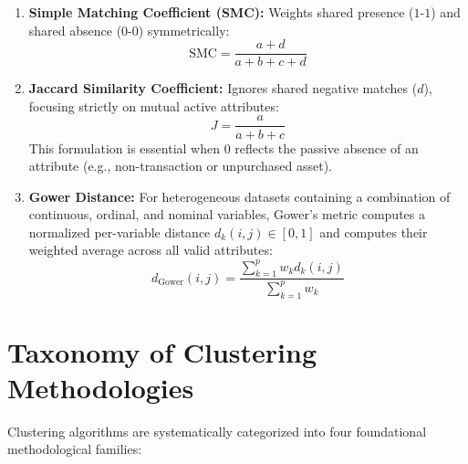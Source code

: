 \begin{enumerate}
    \item \textbf{Simple Matching Coefficient (SMC):} Weights shared presence ($1$-$1$) and shared absence ($0$-$0$) symmetrically:
    \begin{equation}
        \text{SMC} = \frac{a + d}{a + b + c + d}
    \end{equation}
    \item \textbf{Jaccard Similarity Coefficient:} Ignores shared negative matches ($d$), focusing strictly on mutual active attributes:
    \begin{equation}
        J = \frac{a}{a + b + c}
    \end{equation}
    This formulation is essential when $0$ reflects the passive absence of an attribute (e.g., non-transaction or unpurchased asset).
    \item \textbf{Gower Distance:} For heterogeneous datasets containing a combination of continuous, ordinal, and nominal variables, Gower's metric computes a normalized per-variable distance $d_k(i, j) \in [0, 1]$ and computes their weighted average across all valid attributes:
    \begin{equation}
        d_{\text{Gower}}(i, j) = \frac{\sum_{k=1}^p w_k d_k(i, j)}{\sum_{k=1}^p w_k}
    \end{equation}
\end{enumerate}

\section{Taxonomy of Clustering Methodologies}

Clustering algorithms are systematically categorized into four foundational methodological families:

